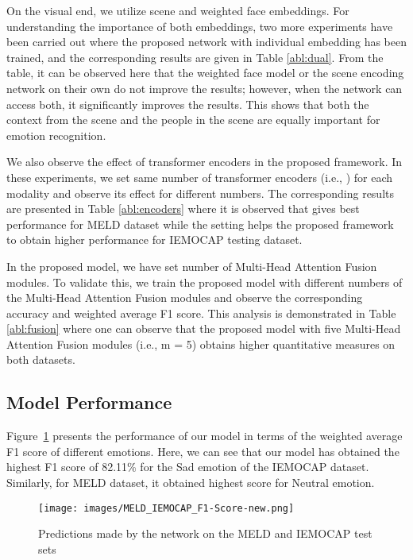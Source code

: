 \documentclass[10pt,twocolumn,letterpaper]{article}
\begin{document}
On the visual end, we utilize scene and weighted face embeddings. For understanding the importance of both embeddings, two more experiments have been carried out where the proposed network with individual embedding has been trained, and the corresponding results are given in Table \ref{abl:dual}. From the table, it can be observed here that the weighted face model or the scene encoding network on their own do not improve the results; however, when the network can access both, it significantly improves the results. This shows that both the context from the scene and the people in the scene are equally important for emotion recognition. 

We also observe the effect of transformer encoders in the proposed framework. In these experiments, we set same number of transformer encoders (i.e., ) for each modality and observe its effect for different numbers. The corresponding results are presented in Table \ref{abl:encoders} where it is observed that  gives best performance for MELD dataset while the  setting helps the proposed framework to obtain higher performance for IEMOCAP testing dataset.

In the proposed model, we have set  number of Multi-Head Attention Fusion modules. To validate this, we train the proposed model with different numbers of the Multi-Head Attention Fusion modules and observe the corresponding accuracy and weighted average F1 score. This analysis is demonstrated in Table \ref{abl:fusion} where one can observe that the proposed model with five Multi-Head Attention Fusion modules (i.e., m = 5) obtains higher quantitative measures on both datasets.
\subsection{Model Performance}
Figure~\ref{fig:prediction} presents the performance of our model in terms of the weighted average F1 score of different emotions. Here, we can see that our model has obtained the highest F1 score of 82.11\% for the Sad emotion of the IEMOCAP dataset. Similarly, for MELD dataset, it obtained highest score for Neutral emotion. 

\begin{figure}[t!]
    \centering
\texttt{[image: images/MELD\_IEMOCAP\_F1-Score-new.png]} \caption{Predictions made by the network on the MELD and IEMOCAP test sets}
    \label{fig:prediction}
\end{figure}
\end{document}
